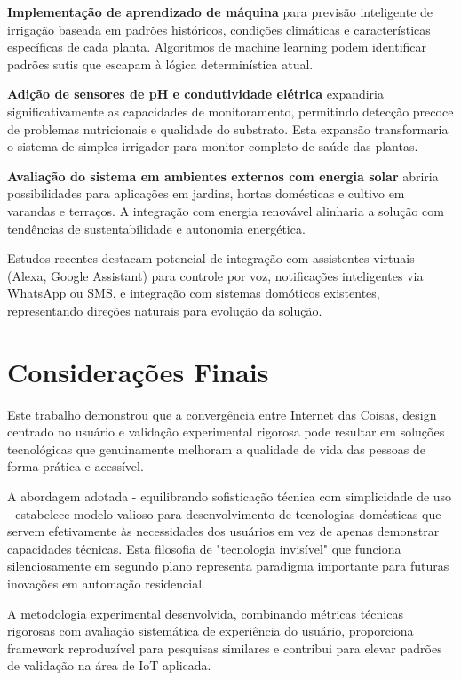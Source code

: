 \documentclass[twoside,english,brazilian]{UNISINOSmonografia}
\begin{document}
\textbf{Implementação de aprendizado de máquina} para previsão inteligente de irrigação baseada em padrões históricos, condições climáticas e características específicas de cada planta. Algoritmos de machine learning podem identificar padrões sutis que escapam à lógica determinística atual.

\textbf{Adição de sensores de pH e condutividade elétrica} expandiria significativamente as capacidades de monitoramento, permitindo detecção precoce de problemas nutricionais e qualidade do substrato. Esta expansão transformaria o sistema de simples irrigador para monitor completo de saúde das plantas.

\textbf{Avaliação do sistema em ambientes externos com energia solar} abriria possibilidades para aplicações em jardins, hortas domésticas e cultivo em varandas e terraços. A integração com energia renovável alinharia a solução com tendências de sustentabilidade e autonomia energética.

Estudos recentes destacam potencial de integração com assistentes virtuais (Alexa, Google Assistant) para controle por voz, notificações inteligentes via WhatsApp ou SMS, e integração com sistemas domóticos existentes, representando direções naturais para evolução da solução.

\section{Considerações Finais}

Este trabalho demonstrou que a convergência entre Internet das Coisas, design centrado no usuário e validação experimental rigorosa pode resultar em soluções tecnológicas que genuinamente melhoram a qualidade de vida das pessoas de forma prática e acessível.

A abordagem adotada - equilibrando sofisticação técnica com simplicidade de uso - estabelece modelo valioso para desenvolvimento de tecnologias domésticas que servem efetivamente às necessidades dos usuários em vez de apenas demonstrar capacidades técnicas. Esta filosofia de "tecnologia invisível" que funciona silenciosamente em segundo plano representa paradigma importante para futuras inovações em automação residencial.

A metodologia experimental desenvolvida, combinando métricas técnicas rigorosas com avaliação sistemática de experiência do usuário, proporciona framework reproduzível para pesquisas similares e contribui para elevar padrões de validação na área de IoT aplicada.
\end{document}
